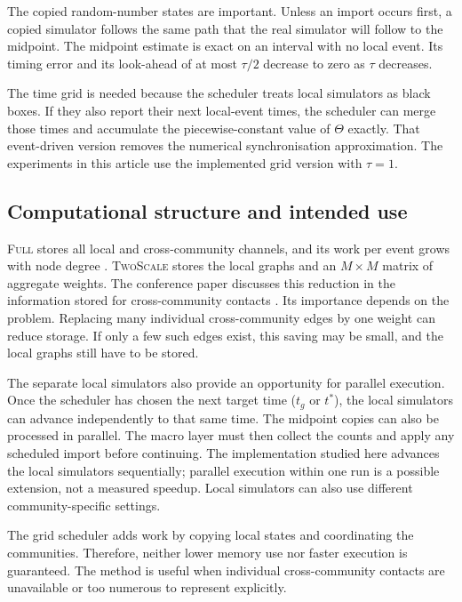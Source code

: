 \documentclass[a4paper,fleqn]{cas-sc}
\newcommand{\Full}{\textup{\textsc{Full}}}
\newcommand{\TS}{\textup{\textsc{TwoScale}}}
\begin{document}
The copied random-number states are important. Unless an import occurs first, a copied simulator follows the same path that the real simulator will follow to the midpoint. The midpoint estimate is exact on an interval with no local event. Its timing error and its look-ahead of at most $\tau/2$ decrease to zero as $\tau$ decreases.

The time grid is needed because the scheduler treats local simulators as black boxes. If they also report their next local-event times, the scheduler can merge those times and accumulate the piecewise-constant value of $\Theta$ exactly. That event-driven version removes the numerical synchronisation approximation. The experiments in this article use the implemented grid version with $\tau=1$.

\subsection{Computational structure and intended use}
\label{sec:cost}

\Full{} stores all local and cross-community channels, and its work per event grows with node degree \citep{kuryliak2025simulating}. \TS{} stores the local graphs and an $M\times M$ matrix of aggregate weights. The conference paper discusses this reduction in the information stored for cross-community contacts \citep{kuryliak2025towards}. Its importance depends on the problem. Replacing many individual cross-community edges by one weight can reduce storage. If only a few such edges exist, this saving may be small, and the local graphs still have to be stored.

The separate local simulators also provide an opportunity for parallel execution. Once the scheduler has chosen the next target time ($t_g$ or $t^\ast$), the local simulators can advance independently to that same time. The midpoint copies can also be processed in parallel. The macro layer must then collect the counts and apply any scheduled import before continuing. The implementation studied here advances the local simulators sequentially; parallel execution within one run is a possible extension, not a measured speedup. Local simulators can also use different community-specific settings.

The grid scheduler adds work by copying local states and coordinating the communities. Therefore, neither lower memory use nor faster execution is guaranteed. The method is useful when individual cross-community contacts are unavailable or too numerous to represent explicitly.
\end{document}
